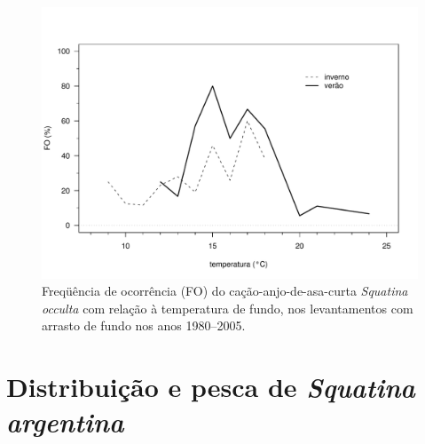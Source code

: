 \documentclass[a4paper,11pt,twoside,showtrims,onecolumn,openright,final]{memoir}
\begin{document}
\begin{figure}
\begin{center}
\includegraphics[width=\textwidth]{Occulta_DistribTempFundo}
\end{center}
\caption[Freqüência de ocorrência (FO) do cação-anjo-de-asa-curta \emph{Squatina occulta}
	 com relação à temperatura de fundo]
	{Freqüência de ocorrência (FO) do cação-anjo-de-asa-curta \emph{Squatina occulta}
	 com relação à temperatura de fundo, nos levantamentos com 
	 arrasto de fundo nos anos 1980--2005.}
\label{fig:occulta-distrib-tempfundo}
\end{figure}


\section*{Distribuição e pesca de  \emph{Squatina argentina}}
\end{document}
